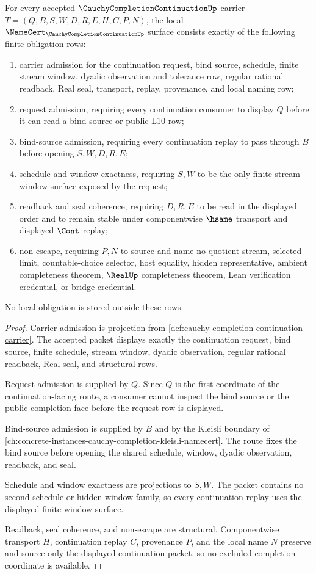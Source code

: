 \begin{theorem}
\label{thm:cauchy-completion-continuation-namecert-obligations}
For every accepted $\CauchyCompletionContinuationUp$ carrier $T=(Q,B,S,W,D,R,E,H,C,P,N)$, the local $\NameCert_{\CauchyCompletionContinuationUp}$ surface consists exactly of the following finite obligation rows:
\begin{enumerate}
\item carrier admission for the continuation request, bind source, schedule, finite stream window, dyadic observation and tolerance row, regular rational readback, Real seal, transport, replay, provenance, and local naming row;
\item request admission, requiring every continuation consumer to display $Q$ before it can read a bind source or public L10 row;
\item bind-source admission, requiring every continuation replay to pass through $B$ before opening $S,W,D,R,E$;
\item schedule and window exactness, requiring $S,W$ to be the only finite stream-window surface exposed by the request;
\item readback and seal coherence, requiring $D,R,E$ to be read in the displayed order and to remain stable under componentwise $\hsame$ transport and displayed $\Cont$ replay;
\item non-escape, requiring $P,N$ to source and name no quotient stream, selected limit, countable-choice selector, host equality, hidden representative, ambient completeness theorem, $\RealUp$ completeness theorem, Lean verification credential, or bridge credential.
\end{enumerate}
No local obligation is stored outside these rows.
\end{theorem}
\begin{proof}
Carrier admission is projection from \autoref{def:cauchy-completion-continuation-carrier}. The accepted packet displays exactly the continuation request, bind source, finite schedule, stream window, dyadic observation, regular rational readback, Real seal, and structural rows.

Request admission is supplied by $Q$. Since $Q$ is the first coordinate of the continuation-facing route, a consumer cannot inspect the bind source or the public completion face before the request row is displayed.

Bind-source admission is supplied by $B$ and by the Kleisli boundary of \autoref{ch:concrete-instances-cauchy-completion-kleisli-namecert}. The route fixes the bind source before opening the shared schedule, window, dyadic observation, readback, and seal.

Schedule and window exactness are projections to $S,W$. The packet contains no second schedule or hidden window family, so every continuation replay uses the displayed finite window surface.

Readback, seal coherence, and non-escape are structural. Componentwise transport $H$, continuation replay $C$, provenance $P$, and the local name $N$ preserve and source only the displayed continuation packet, so no excluded completion coordinate is available.
\end{proof}

